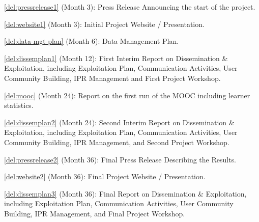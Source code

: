\begin{Workpackage}{\thewpno}
\begin{WPDeliverables}
\begin{compactitem}
\item \ref{del:pressrelease1} (Month 3): Press Release Announcing the start of the \TheProject{} project.
\item \ref{del:website1} (Month 3): Initial Project Website / Presentation.
\item \ref{del:data-mgt-plan} (Month 6): Data Management Plan.
\item \ref{del:dissemplan1} (Month 12): First Interim Report on Dissemination \& Exploitation, including Exploitation Plan, Communication Activities, User Community Building, IPR Management and First Project Workshop.
\item \ref{del:mooc} (Month 24): Report on the first run of the MOOC including learner statistics. 
\item \ref{del:dissemplan2} (Month 24): Second Interim Report on Dissemination \& Exploitation, including Exploitation Plan, Communication Activities, User Community Building, IPR Management, and Second Project Workshop.
\item \ref{del:pressrelease2} (Month 36): Final Press Release Describing the \TheProject{} Results.
\item \ref{del:website2} (Month 36): Final Project Website / Presentation.
\item \ref{del:dissemplan3} (Month 36): Final Report on Dissemination \& Exploitation, including Exploitation Plan, Communication Activities, User Community Building, IPR Management, and Final Project Workshop.\end{compactitem}
\end{WPDeliverables}
\end{Workpackage}

